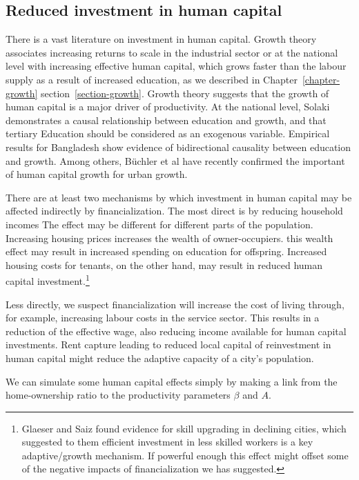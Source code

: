 \subsection{Reduced investment in human capital}

There is a vast literature on investment in human capital. 
Growth theory associates increasing returns to scale in the industrial sector or at the national level with increasing effective human capital, which grows faster than the labour supply as a result of increased education, as we described in Chapter~\ref{chapter-growth} section~\ref{section-growth}. 
Growth theory suggests that the growth of human capital is  a major driver of productivity.  At the national level, Solaki \cite{solakiRelationshipEducationGDP2013} demonstrates a causal relationship between education and growth, and that tertiary Education should be considered as an exogenous variable.  Empirical results for Bangladesh \cite{islam2007relationship}show evidence of bidirectional causality between education and growth.  Among others, B\"uchler et al have recently confirmed the important of human capital growth for urban growth.

There are at least two mechanisms by which investment in human capital may be affected indirectly by financialization. The most direct is by reducing household incomes The effect may be different for different parts of the population. Increasing housing prices increases the wealth of owner-occupiers. this wealth effect may result in increased spending on education for offspring. Increased housing costs for tenants, on the other hand,  may result in reduced human capital investment.\footnote{Glaeser and Saiz found evidence for skill upgrading in declining cities, which suggested to them efficient investment in less skilled workers is a key adaptive/growth mechanism. If powerful enough this effect might offset some of the negative impacts of financialization we has suggested.}  

Less directly, we suspect financialization will increase the cost of living through, for example, increasing labour costs in the service sector. This results in a reduction of the effective wage, also reducing income available for human capital investments. Rent capture leading to reduced local capital of reinvestment in human capital might reduce the adaptive capacity of a city's population.

We can simulate some human capital effects simply by making a link from the home-ownership ratio to the productivity parameters  $\beta$ and $A$. 




